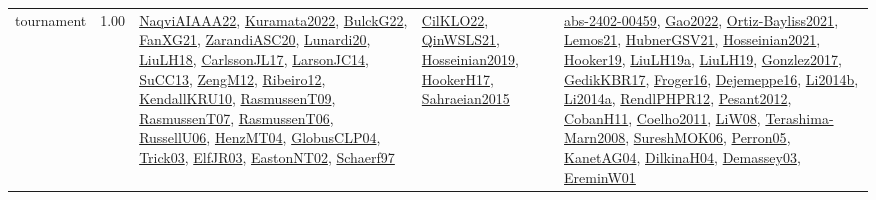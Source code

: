 {\begin{longtable}{p{3cm}r>{\raggedright\arraybackslash}p{6cm}>{\raggedright\arraybackslash}p{6cm}>{\raggedright\arraybackslash}p{8cm}}
\index{tournament}\index{ApplicationAreas!tournament}tournament &  1.00 & \hyperref[detail:NaqviAIAAA22]{NaqviAIAAA22}, \hyperref[detail:Kuramata2022]{Kuramata2022}, \hyperref[detail:BulckG22]{BulckG22}, \hyperref[detail:FanXG21]{FanXG21}, \hyperref[detail:ZarandiASC20]{ZarandiASC20}, \hyperref[detail:Lunardi20]{Lunardi20}, \hyperref[detail:LiuLH18]{LiuLH18}, \hyperref[detail:CarlssonJL17]{CarlssonJL17}, \hyperref[detail:LarsonJC14]{LarsonJC14}, \hyperref[detail:SuCC13]{SuCC13}, \hyperref[detail:ZengM12]{ZengM12}, \hyperref[detail:Ribeiro12]{Ribeiro12}, \hyperref[detail:KendallKRU10]{KendallKRU10}, \hyperref[detail:RasmussenT09]{RasmussenT09}, \hyperref[detail:RasmussenT07]{RasmussenT07}, \hyperref[detail:RasmussenT06]{RasmussenT06}, \hyperref[detail:RussellU06]{RussellU06}, \hyperref[detail:HenzMT04]{HenzMT04}, \hyperref[detail:GlobusCLP04]{GlobusCLP04}, \hyperref[detail:Trick03]{Trick03}, \hyperref[detail:ElfJR03]{ElfJR03}, \hyperref[detail:EastonNT02]{EastonNT02}, \hyperref[detail:Schaerf97]{Schaerf97} & \hyperref[detail:CilKLO22]{CilKLO22}, \hyperref[detail:QinWSLS21]{QinWSLS21}, \hyperref[detail:Hosseinian2019]{Hosseinian2019}, \hyperref[detail:HookerH17]{HookerH17}, \hyperref[detail:Sahraeian2015]{Sahraeian2015} & \hyperref[detail:abs-2402-00459]{abs-2402-00459}, \hyperref[detail:Gao2022]{Gao2022}, \hyperref[detail:Ortiz-Bayliss2021]{Ortiz-Bayliss2021}, \hyperref[detail:Lemos21]{Lemos21}, \hyperref[detail:HubnerGSV21]{HubnerGSV21}, \hyperref[detail:Hosseinian2021]{Hosseinian2021}, \hyperref[detail:Hooker19]{Hooker19}, \hyperref[detail:LiuLH19a]{LiuLH19a}, \hyperref[detail:LiuLH19]{LiuLH19}, \hyperref[detail:Gonzlez2017]{Gonzlez2017}, \hyperref[detail:GedikKBR17]{GedikKBR17}, \hyperref[detail:Froger16]{Froger16}, \hyperref[detail:Dejemeppe16]{Dejemeppe16}, \hyperref[detail:Li2014b]{Li2014b}, \hyperref[detail:Li2014a]{Li2014a}, \hyperref[detail:RendlPHPR12]{RendlPHPR12}, \hyperref[detail:Pesant2012]{Pesant2012}, \hyperref[detail:CobanH11]{CobanH11}, \hyperref[detail:Coelho2011]{Coelho2011}, \hyperref[detail:LiW08]{LiW08}, \hyperref[detail:Terashima-Marn2008]{Terashima-Marn2008}, \hyperref[detail:SureshMOK06]{SureshMOK06}, \hyperref[detail:Perron05]{Perron05}, \hyperref[detail:KanetAG04]{KanetAG04}, \hyperref[detail:DilkinaH04]{DilkinaH04}, \hyperref[detail:Demassey03]{Demassey03}, \hyperref[detail:EreminW01]{EreminW01}\\

\end{longtable}}
